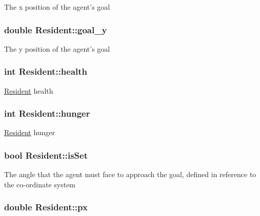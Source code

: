 The x position of the agent's goal \hypertarget{classResident_a30e28a999b67c4db3500c9c3c9989a10}{
\subsubsection[{goal\-\_\-y}]{\setlength{\rightskip}{0pt plus 5cm}double Resident\-::goal\-\_\-y\hspace{0.3cm}{\ttfamily [protected]}}}\label{classResident_a30e28a999b67c4db3500c9c3c9989a10}
The y position of the agent's goal \hypertarget{classResident_ac603d9684120e1ab66a4340797bb7e90}{
\subsubsection[{health}]{\setlength{\rightskip}{0pt plus 5cm}int Resident\-::health\hspace{0.3cm}{\ttfamily [protected]}}}\label{classResident_ac603d9684120e1ab66a4340797bb7e90}
\hyperlink{classResident}{Resident} health \hypertarget{classResident_a337df4272a4640a4039dfbe5c5c4a6d6}{
\subsubsection[{hunger}]{\setlength{\rightskip}{0pt plus 5cm}int Resident\-::hunger\hspace{0.3cm}{\ttfamily [protected]}}}\label{classResident_a337df4272a4640a4039dfbe5c5c4a6d6}
\hyperlink{classResident}{Resident} hunger \hypertarget{classResident_ac5e7527b191e07372c3ea5e9aa81a65d}{
\subsubsection[{is\-Set}]{\setlength{\rightskip}{0pt plus 5cm}bool Resident\-::is\-Set\hspace{0.3cm}{\ttfamily [protected]}}}\label{classResident_ac5e7527b191e07372c3ea5e9aa81a65d}
The angle that the agent must face to approach the goal, defined in reference to the co-\/ordinate system \hypertarget{classResident_aa147b3e473b2ea32b732eb5146ec7e34}{
\subsubsection[{px}]{\setlength{\rightskip}{0pt plus 5cm}double Resident\-::px\hspace{0.3cm}{\ttfamily [protected]}}}\label{classResident_aa147b3e473b2ea32b732eb5146ec7e34}

